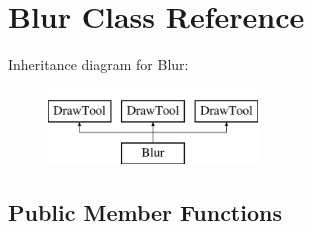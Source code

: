 \hypertarget{classBlur}{\section{Blur Class Reference}
\label{classBlur}
}
Inheritance diagram for Blur\-:\begin{figure}[H]
\begin{center}
\leavevmode
\includegraphics[height=2.000000cm]{classBlur}
\end{center}
\end{figure}
\subsection*{Public Member Functions}

